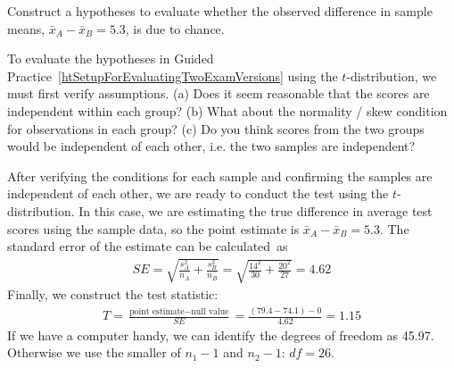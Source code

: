 \begin{exercisewrap}
\begin{nexercise}
\label{htSetupForEvaluatingTwoExamVersions}%
Construct a hypotheses to evaluate whether the observed difference in sample means, $\bar{x}_A - \bar{x}_B=5.3$, is due to chance.\footnotemark{}
\end{nexercise}
\end{exercisewrap}

\begin{exercisewrap}
\begin{nexercise} \label{conditionsForTDistForEvaluatingTwoExamVersions}%
To evaluate the hypotheses in Guided Practice~\ref{htSetupForEvaluatingTwoExamVersions} using the $t$-distribution, we must first verify assumptions. (a) Does it seem reasonable that the scores are independent within each group? (b) What about the normality / skew condition for observations in each group? (c) Do you think scores from the two groups would be independent of each other, i.e. the two samples are independent?\footnotemark{}
\end{nexercise}
\end{exercisewrap}

After verifying the conditions for each sample and confirming the samples are independent of each other, we are ready to conduct the test using the $t$-distribution. In this case, we are estimating the true difference in average test scores using the sample data, so the point estimate is $\bar{x}_A - \bar{x}_B = 5.3$. The standard error of the estimate can be calculated~as
\begin{align*}
SE
  = \sqrt{\frac{s_A^2}{n_A} + \frac{s_B^2}{n_B}}
  = \sqrt{\frac{14^2}{30} + \frac{20^2}{27}}
  = 4.62
\end{align*}
Finally, we construct the test statistic:
\begin{align*}
T
  = \frac{\text{point estimate} - \text{null value}}{SE}
  = \frac{(79.4-74.1) - 0}{4.62}
  = 1.15
\end{align*}
If we have a computer handy, we can identify the degrees of freedom as 45.97. Otherwise we use the smaller of $n_1-1$ and $n_2-1$: $df=26$. 

